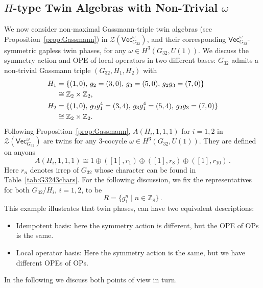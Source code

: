 \documentclass[aps,twocolumn,prx,floatfix,preprintnumbers, nofootinbib,10pt]{revtex4-2}
\numberwithin{equation}{section}
\theoremstyle{definition}
\newcommand{\be}{\begin{equation}}
\newcommand{\ee}{\end{equation}}
\newcommand{\Z}{{\mathbb Z}}
\newcommand{\cZ}{\mathcal{Z}}
\renewcommand{\Vec}{\mathsf{Vec}}
\begin{document}
\subsection{$H$-type Twin Algebras with Non-Trivial $\omega$} 
\label{sec:Gassmann_example}
We now consider non-maximal Gassmann-triple twin algebras (see Proposition~\ref{prop:Gassmann}) in $\cZ(\Vec_{G_{32}}^\omega)$, and their corresponding $\Vec_{G_{32}}^\omega$-symmetric gapless twin phases, for any $\omega\in H^3(G_{32},U(1))$. We discuss the symmetry action and OPE of local operators in two different bases:
$G_{32}$ admits a non-trivial Gassmann triple $(G_{32}, H_1, H_2)$ with 
\be
\label{eqn:HinG32-43}
    \begin{split}
        H_1 & =\{(1,0),\,g_2=(3,0),\,g_3=(5,0),\,
        g_2 g_3=(7,0)\}\cr 
        &\cong \Z_2 \times \Z_2,\\
    H_2 & =\{(1,0),\,
    g_2 g_1^4= (3,4),\, g_3 g_1^4=(5,4), \,g_2g_3=(7,0)\}\cr 
    &\cong \Z_2 \times \Z_2.
    \end{split}
\ee
Following Proposition~\ref{prop:Gassmann}, $A(H_i,1,1,1)$ for $i=1,2$ in $\cZ(\Vec_{G_{32}}^\omega)$ are twins for any 3-cocycle $\omega\in H^3(G_{32},U(1))$. They are defined on anyons 
\be \label{eq:AH1H2_anyons}
    A(H_i,1,1,1) \cong 1 \oplus ([1],r_1) \oplus ([1],r_8) \oplus ([1],r_{10})\,.
\ee
Here $r_n$ denotes irrep of $G_{32}$ whose character can be found in Table~\ref{tab:G3243chars}.
For the following discussion, we fix the representatives for both $G_{32}/H_i$, $i=1,2$, to be
\be \label{eq:R_Gassman}
    R=\{g_1^n \;|\; n\in\Z_8\}\,.
\ee
This example illustrates that twin phases, can have two equivalent descriptions: 
\begin{itemize}
\item Idempotent basis: here the symmetry action is different, but the OPE of OPs is the same. 
\item Local operator basis: Here the symmetry action is the same, but we have different OPEs of OPs. 
\end{itemize}
In the following we discuss both points of view in turn. 
\end{document}
